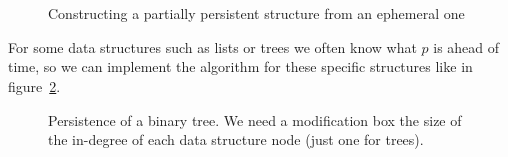 \documentclass[11pt]{article}
\begin{document}
\begin{figure}
  \centering
  \\
  \\
  \caption{Constructing a partially persistent structure from an ephemeral one}
  \label{fig:partial-persistent}
\end{figure}

For some data structures such as lists or trees we often know what $p$ is ahead of time, so we can implement the algorithm for these specific structures like in figure~\ref{binary-tree}. 

\begin{figure}[h]
  \begin{center}
  \end{center}
  \caption{\small Persistence of a binary tree. We need a modification box the size of the in-degree of each data structure node (just one for trees).}
  \label{binary-tree}
\end{figure}
\end{document}
